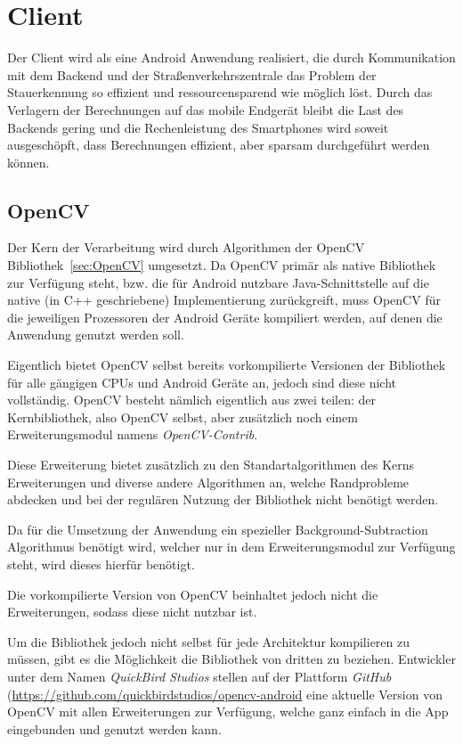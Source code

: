 \section{Client}
Der Client wird als eine Android Anwendung realisiert, die durch Kommunikation mit dem Backend und der Straßenverkehrszentrale das Problem der Stauerkennung so effizient und ressourcensparend wie möglich löst.
Durch das Verlagern der Berechnungen auf das mobile Endgerät bleibt die Last des Backends gering und die Rechenleistung des Smartphones wird soweit ausgeschöpft, dass Berechnungen effizient, aber sparsam durchgeführt werden können.

\subsection{OpenCV}
Der Kern der Verarbeitung wird durch Algorithmen der OpenCV Bibliothek~\ref{sec:OpenCV} umgesetzt.
Da OpenCV primär als native Bibliothek zur Verfügung steht, bzw. die für Android nutzbare Java-Schnittstelle auf die native (in C++ geschriebene) Implementierung
zurückgreift, muss OpenCV für die jeweiligen Prozessoren der Android Geräte kompiliert werden, auf denen die Anwendung genutzt werden soll.

Eigentlich bietet OpenCV selbst bereits vorkompilierte Versionen der Bibliothek für alle gängigen CPUs und Android Geräte an, jedoch sind diese nicht vollständig.
OpenCV besteht nämlich eigentlich aus zwei teilen: der Kernbibliothek, also OpenCV selbst, aber zusätzlich noch einem Erweiterungsmodul namens {\em OpenCV-Contrib}.

Diese Erweiterung bietet zusätzlich zu den Standartalgorithmen des Kerns Erweiterungen und diverse andere Algorithmen an, welche Randprobleme abdecken und bei der regulären Nutzung der Bibliothek nicht benötigt werden.

Da für die Umsetzung der Anwendung ein spezieller Background-Subtraction Algorithmus benötigt wird, welcher nur in dem Erweiterungsmodul zur Verfügung steht, wird dieses hierfür benötigt.

Die vorkompilierte Version von OpenCV beinhaltet jedoch nicht die Erweiterungen, sodass diese nicht nutzbar ist.

Um die Bibliothek jedoch nicht selbst für jede Architektur kompilieren zu müssen, gibt es die Möglichkeit die Bibliothek von dritten zu beziehen.
Entwickler unter dem Namen {\em QuickBird Studios} stellen auf der Plattform {\em GitHub} (\url{https://github.com/quickbirdstudios/opencv-android} eine aktuelle Version von OpenCV mit allen Erweiterungen zur Verfügung, welche ganz einfach in die App eingebunden und genutzt werden kann.

